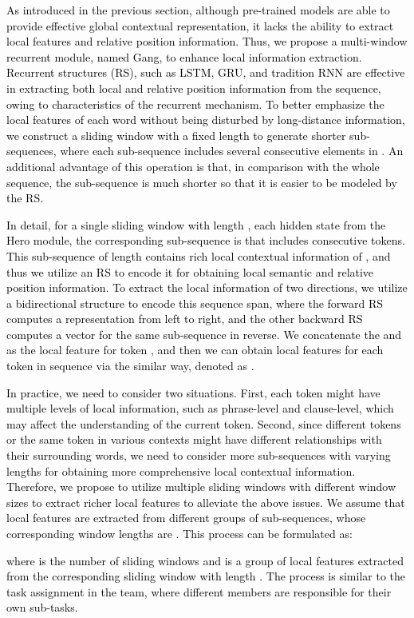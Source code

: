 \documentclass[11pt]{article}
\begin{document}
\textcolor{black}{As introduced in the previous section, although pre-trained models are able to provide effective global contextual representation, it lacks the ability to extract local features and relative position information.
\textcolor{black}{Thus, we propose a multi-window recurrent module, named Gang, to enhance local information extraction.}
Recurrent structures (RS), such as LSTM, GRU, and tradition RNN are effective in extracting both local and relative position information from the sequence, owing to characteristics of the recurrent mechanism.
To better emphasize the local features of each word without being disturbed by long-distance information, we construct a sliding window with a fixed length to generate shorter sub-sequences, where each sub-sequence includes several consecutive elements in .
An additional advantage of this operation is that, in comparison with the whole sequence, the sub-sequence is much shorter so that it is easier to be modeled by the RS.
}

\textcolor{black}{
In detail, for a single sliding window with length , each hidden state  from the Hero module, the corresponding sub-sequence is  that includes  consecutive tokens.
This sub-sequence of length  contains rich local contextual information of , and thus we utilize an RS to encode it for obtaining local semantic and relative position information.
To extract the local information of two directions, we utilize a bidirectional structure to encode this sequence span, where the forward RS computes a representation  from left to right, and the other backward RS computes a vector  for the same sub-sequence in reverse.}
\textcolor{black}{We concatenate the  and  as the local feature  for token , and then we can obtain local features for each token in sequence  via the similar way, denoted as .}

\textcolor{black}{In practice, we need to consider two situations.
First, each token might have multiple levels of local information, such as phrase-level and clause-level, which may affect the understanding of the current token.
Second, since different tokens or the same token in various contexts might have different relationships with their surrounding words, we need to consider more sub-sequences with varying lengths for obtaining more comprehensive local contextual information.
Therefore, we propose to utilize multiple sliding windows with different window sizes to extract richer local features to alleviate the above issues.
We assume that local features  are extracted from different groups of sub-sequences, whose corresponding window lengths are . This process can be formulated as:
}
\textcolor{black}{

\textcolor{black}{
where  is the number of sliding windows and  is a group of local features extracted from the corresponding sliding window with length . The process is similar to the task assignment in the team, where different members are responsible for their own sub-tasks.
}}
\end{document}
